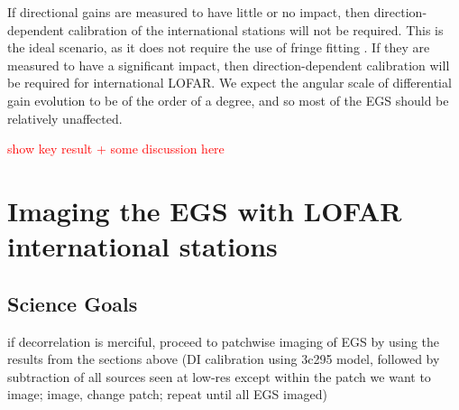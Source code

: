 \pg
If directional gains are measured to have little or no impact, then direction-dependent calibration of the international stations will not be required. This is the ideal scenario, as it does not require the use of fringe fitting . If they are measured to have a significant impact, then direction-dependent calibration will be required for international LOFAR. We expect the angular scale of differential gain evolution to be of the order of a degree, and so most of the EGS should be relatively unaffected.

\pg
\textcolor{red}{show key result + some discussion here}


\section{Imaging the EGS with LOFAR international stations}

\subsection{Science Goals}

\pg
if decorrelation is merciful, proceed to patchwise imaging of EGS by using the results from the sections above (DI calibration using 3c295 model, followed by subtraction of all sources seen at low-res except within the patch we want to image; image, change patch; repeat until all EGS imaged)

\newpage